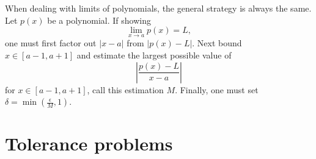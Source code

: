 \documentclass{ximera}
\begin{document}
When dealing with limits of polynomials, the general strategy is
always the same. Let $p(x)$ be a polynomial. If showing
\[
\lim_{x\to a} p(x) = L,
\]
one must first factor out $|x-a|$ from $|p(x) - L|$. Next bound $x\in
[a-1,a+1]$ and estimate the largest possible value of
\[
\left|\frac{p(x) -L}{x-a}\right|
\]
for $x\in[a-1,a+1]$, call this estimation $M$. Finally, one must set
$\delta = \min\left(\frac{\epsilon}{M}, 1\right)$.

\section{Tolerance problems}
\end{document}
